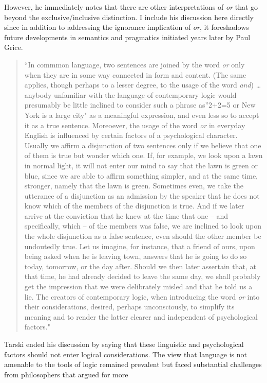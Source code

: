 \documentclass[oneside]{report}
\theoremstyle{definition}
\theoremstyle{definition}
\theoremstyle{definition}
\theoremstyle{remark}
\begin{document}
However, he immediately notes that there are other interpretations of
\emph{or} that go beyond the exclusive/inclusive distinction. I include
his discussion here directly since in addition to addressing the
ignorance implication of \emph{or}, it foreshadows future developments
in semantics and pragmatics initiated years later by Paul Grice.
\begin{quote}
``In commmon language, two sentences are joined by the word \emph{or}
only when they are in some way connected in form and content. (The same
applies, though perhaps to a lesser degree, to the usage of the word
\emph{and}) \ldots{} anybody unfamiliar with the language of
contemporary logic would presumably be little inclined to consider such
a phrase as''2+2=5 or New York is a large city" as a meaningful
expression, and even less so to accept it as a true sentence. Moreoever,
the usage of the word \emph{or} in everyday English is influenced by
certain factors of a psychological character. Usually we affirm a
disjunction of two sentences only if we believe that one of them is true
but wonder which one. If, for example, we look upon a lawn in normal
light, it will not enter our mind to say that the lawn is green or blue,
since we are able to affirm something simpler, and at the same time,
stronger, namely that the lawn is green. Sometimes even, we take the
utterance of a disjunction as an admission by the speaker that he does
not know which of the members of the disjunction is true. And if we
later arrive at the conviction that he knew at the time that one -- and
specifically, which -- of the members was false, we are inclined to look
upon the whole disjunction as a false sentence, even should the other
member be undoutedly true. Let us imagine, for instance, that a friend
of ours, upon being asked when he is leaving town, answers that he is
going to do so today, tomorrow, or the day after. Should we then later
assertain that, at that time, he had already decided to leave the same
day, we shall probably get the impression that we were delibrately
misled and that he told us a lie. The creators of contemporary logic,
when introducing the word \emph{or} into their considerations, desired,
perhaps unconsciously, to simplify its meaning and to render the latter
clearer and independent of psychological factors."
\end{quote}
Tarski ended his discussion by saying that these linguistic and
psychological factors should not enter logical considerations. The view
that language is not amenable to the tools of logic remained prevalent
but faced substantial challenges from philosophers that argued for more
\end{document}
